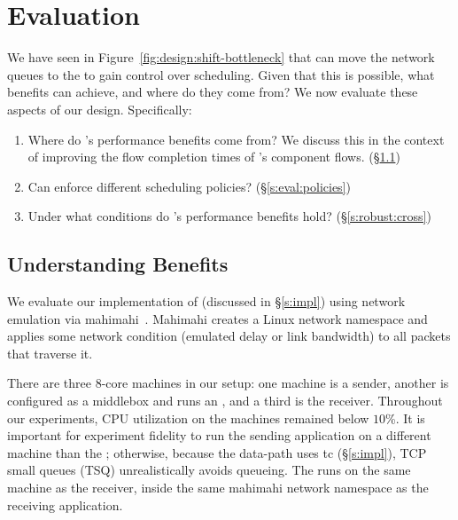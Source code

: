 \section{Evaluation}\label{s:eval}

We have seen in Figure~\ref{fig:design:shift-bottleneck} that \name can move the network queues to the \inbox to gain control over scheduling. Given that this is possible, what benefits can \name achieve, and where do they come from?
We now evaluate these aspects of our design. Specifically:
\begin{enumerate}
    \item Where do \name's performance benefits come from? We discuss this in the context of improving the flow completion times of \name's component flows. (\S\ref{s:eval:fct})
    \item Can \name enforce different scheduling policies? (\S\ref{s:eval:policies})
    \item Under what conditions do \name's performance benefits hold? (\S\ref{s:robust:cross})
\end{enumerate}

\subsection{Understanding Benefits}\label{s:eval:fct}

We evaluate our implementation of \name (discussed in \S\ref{s:impl}) using network emulation via mahimahi~\cite{mahimahi}.
Mahimahi creates a Linux network namespace and applies some network condition (emulated delay or link bandwidth) to all packets that traverse it.

There are three $8$-core machines in our setup: one machine is a sender, another is configured as a middlebox and runs an \inbox, and a third is the receiver. Throughout our experiments, CPU utilization on the machines remained below $10$\%.
It is important for experiment fidelity to run the sending application on a different machine than the \inbox; otherwise, because the \inbox data-path uses tc (\S\ref{s:impl}), TCP small queues (TSQ) unrealistically avoids queueing.
The \outbox runs on the same machine as the receiver, inside the same mahimahi network namespace as the receiving application.

